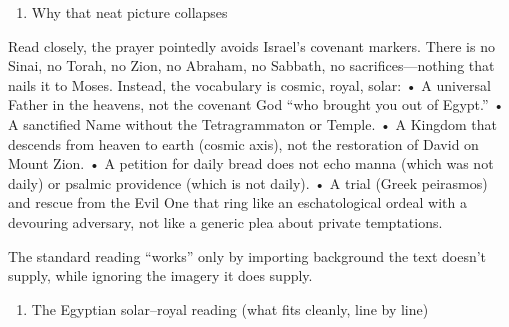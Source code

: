 \begin{enumerate}
\def\labelenumi{\arabic{enumi})}
\setcounter{enumi}{1}
\tightlist
\item
  Why that neat picture collapses
\end{enumerate}

Read closely, the prayer pointedly avoids Israel's covenant markers.
There is no Sinai, no Torah, no Zion, no Abraham, no Sabbath, no sacrifices---nothing that nails it to Moses.
Instead, the vocabulary is cosmic, royal, solar: • A universal Father in the heavens, not the covenant God ``who brought you out of Egypt.'' • A sanctified Name without the Tetragrammaton or Temple.
• A Kingdom that descends from heaven to earth (cosmic axis), not the restoration of David on Mount Zion.
• A petition for daily bread does not echo manna (which was not daily) or psalmic providence (which is not daily).
• A trial (Greek peirasmos) and rescue from the Evil One that ring like an eschatological ordeal with a devouring adversary, not like a generic plea about private temptations.

The standard reading ``works'' only by importing background the text doesn't supply, while ignoring the imagery it does supply.

\begin{enumerate}
\def\labelenumi{\arabic{enumi})}
\setcounter{enumi}{2}
\tightlist
\item
  The Egyptian solar--royal reading (what fits cleanly, line by line)
\end{enumerate}

